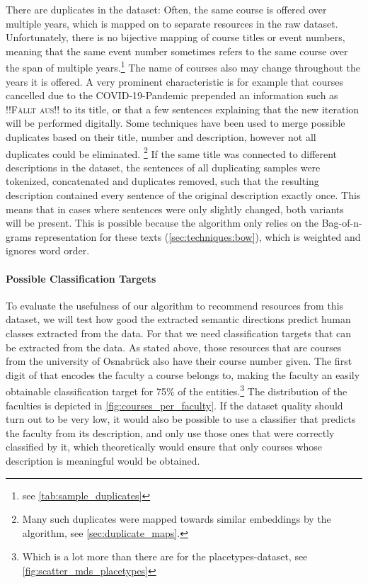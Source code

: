 There are duplicates in the dataset: Often, the same course is offered over multiple years, which is mapped on to separate resources in the raw dataset. Unfortunately, there is no bijective mapping of course titles or event numbers, meaning that the same event number sometimes refers to the same course over the span of multiple years.\footnote{see \autoref{tab:sample_duplicates}} The name of courses also may change throughout the years it is offered. A very prominent characteristic is for example that courses cancelled due to the COVID-19-Pandemic prepended an information such as \textsc{!!Fällt aus!!} to its title, or that a few sentences explaining that the new iteration will be performed digitally. Some techniques have been used to merge possible duplicates based on their title, number and description, however not all duplicates could be eliminated. \footnote{Many such duplicates were mapped towards similar embeddings by the algorithm, see \autoref{sec:duplicate_maps}.} If the same title was connected to different descriptions in the dataset, the sentences of all duplicating samples were tokenized, concatenated and duplicates removed, such that the resulting description contained every sentence of the original description exactly once. This means that in cases where sentences were only slightly changed, both variants will be present. This is possible because the algorithm only relies on the Bag-of-n-grams representation for these texts (\autoref{sec:techniques:bow}), which is weighted and ignores word order.


\paragraph{Possible Classification Targets}

To evaluate the usefulness of our algorithm to recommend resources from this dataset, we will test how good the extracted semantic directions predict human classes extracted from the data. For that we need classification targets that can be extracted from the data. As stated above, those resources that are courses from the university of Osnabrück also have their course number given. The first digit of that encodes the faculty a course belongs to, making the faculty an easily obtainable classification target for 75\% of the entities.\footnote{Which is a lot more than there are for the placetypes-dataset, see \autoref{fig:scatter_mds_placetypes}} The distribution of the faculties is depicted in \ref{fig:courses_per_faculty}. If the dataset quality should turn out to be very low, it would also be possible to use a classifier that predicts the faculty from its description, and only use those ones that were correctly classified by it, which theoretically would ensure that only courses whose description is meaningful would be obtained. 

